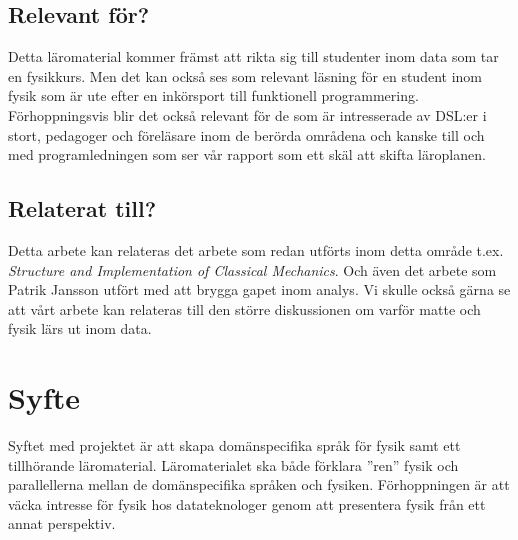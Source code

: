 \documentclass[12pt,a4paper]{article}
\begin{document}
\subsection{Relevant för?}

Detta läromaterial kommer främst att rikta sig till studenter inom data som tar en fysikkurs. Men det kan också ses som relevant läsning för en student inom fysik som är ute efter en inkörsport till funktionell programmering.
%
Förhoppningsvis blir det också relevant för de som är intresserade av DSL:er i stort, pedagoger och föreläsare inom de berörda områdena
%
och kanske till och med programledningen som ser vår rapport som ett skäl att skifta läroplanen.

\subsection{Relaterat till?}

Detta arbete kan relateras det arbete som redan utförts inom detta område t.ex. \textit{Structure and Implementation of Classical Mechanics}.
Och även det arbete som Patrik Jansson utfört med att brygga gapet inom analys.
Vi skulle också gärna se att vårt arbete kan relateras till den större diskussionen om varför matte och fysik lärs ut inom data.


\section{Syfte}

Syftet med projektet är att skapa domänspecifika språk för fysik samt ett tillhörande läromaterial. Läromaterialet ska både förklara ''ren'' fysik och parallellerna mellan de domänspecifika språken och fysiken. Förhoppningen är att väcka intresse för fysik hos datateknologer genom att presentera fysik från ett annat perspektiv.

%
\end{document}
